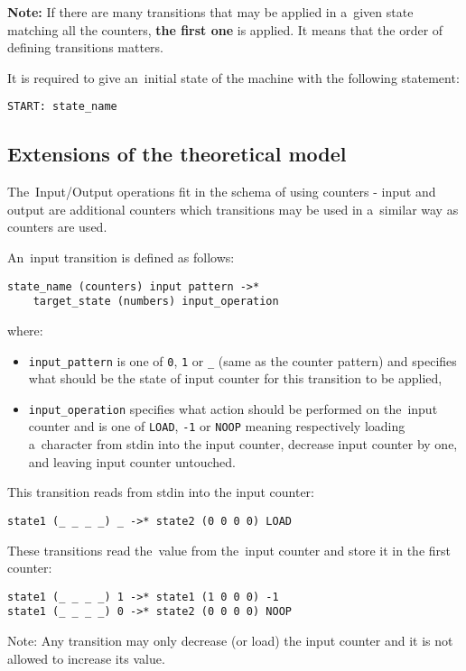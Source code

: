 \documentclass[english,shortabstract,mgr]{iithesis}
\begin{document}
\textbf{Note:} If there are many transitions that may be applied in a~given state
matching all the counters, \textbf{the first one} is applied. It means that the order
of defining transitions matters.

It is required to give an~initial state of the machine with the following statement:
\begin{verbatim}
START: state_name
\end{verbatim}

\subsection {Extensions of the theoretical model}

The~Input/Output operations fit in the schema of using counters - input and output
are additional counters which transitions may be used in a~similar way as counters are used.

An~input transition is defined as follows:
\begin{verbatim}
state_name (counters) input pattern ->*
    target_state (numbers) input_operation
\end{verbatim}
%
where:
\begin{itemize}
  \item \texttt{input\_pattern} is one of \texttt{0}, \texttt{1} or \texttt{\_}
      (same as the counter pattern) and specifies what should be the state
      of input counter for this transition to be applied,
  \item \texttt{input\_operation} specifies what action should be performed
      on the~input counter and is one of \texttt{LOAD}, \texttt{-1} or \texttt{NOOP}
      meaning respectively loading a~character from stdin into the input counter,
      decrease input counter by one, and leaving input counter untouched.
\end{itemize}

This transition reads from stdin into the input counter:
\begin{verbatim}
state1 (_ _ _ _) _ ->* state2 (0 0 0 0) LOAD
\end{verbatim}

These transitions read the~value from the~input counter and store it in the first counter:
\begin{verbatim}
state1 (_ _ _ _) 1 ->* state1 (1 0 0 0) -1
state1 (_ _ _ _) 0 ->* state2 (0 0 0 0) NOOP
\end{verbatim}

Note: Any transition may only decrease (or load) the input counter
and it is not allowed to increase its value.
\end{document}
